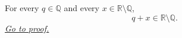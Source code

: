 \begin{lemma}
\label{lem:rational-translation-preserves-irrationality}
For every $q\in\mathbb{Q}$ and every $x\in\mathbb{R}\setminus\mathbb{Q}$,
\[
  q+x\in\mathbb{R}\setminus\mathbb{Q}.
\]
\hyperref[prf:rational-translation-preserves-irrationality]{\textit{Go to proof.}}
\end{lemma}